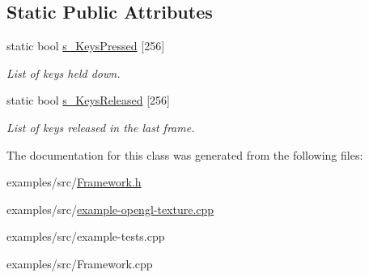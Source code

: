 \subsection*{Static Public Attributes}
\begin{DoxyCompactItemize}
\item 
\hypertarget{class_t_i_l_f_w_1_1_framework_a36e2f073c0d10ce62ee0baf813b60d00}{
static bool \hyperlink{class_t_i_l_f_w_1_1_framework_a36e2f073c0d10ce62ee0baf813b60d00}{s\_\-KeysPressed} \mbox{[}256\mbox{]}}
\label{class_t_i_l_f_w_1_1_framework_a36e2f073c0d10ce62ee0baf813b60d00}

\begin{DoxyCompactList}\small\item\em List of keys held down. \item\end{DoxyCompactList}\item 
\hypertarget{class_t_i_l_f_w_1_1_framework_a64f626069888ea204f062e746b5deff2}{
static bool \hyperlink{class_t_i_l_f_w_1_1_framework_a64f626069888ea204f062e746b5deff2}{s\_\-KeysReleased} \mbox{[}256\mbox{]}}
\label{class_t_i_l_f_w_1_1_framework_a64f626069888ea204f062e746b5deff2}

\begin{DoxyCompactList}\small\item\em List of keys released in the last frame. \item\end{DoxyCompactList}\end{DoxyCompactItemize}


The documentation for this class was generated from the following files:\begin{DoxyCompactItemize}
\item 
examples/src/\hyperlink{_framework_8h}{Framework.h}\item 
examples/src/\hyperlink{example-opengl-texture_8cpp}{example-\/opengl-\/texture.cpp}\item 
examples/src/example-\/tests.cpp\item 
examples/src/Framework.cpp\end{DoxyCompactItemize}
